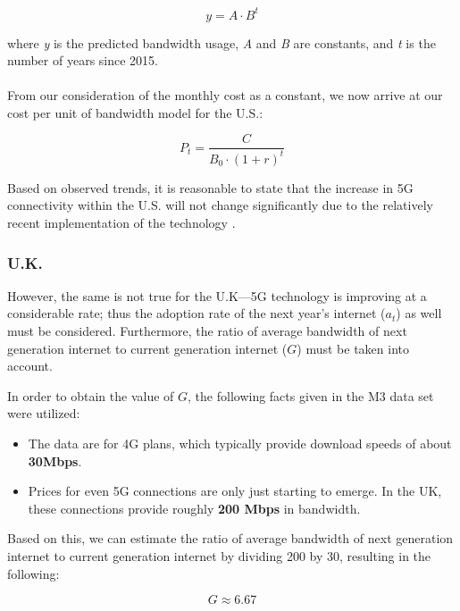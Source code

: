 \documentclass[12pt]{article}
\begin{document}
\begin{equation*}
    y = A \cdot B^{t}
\end{equation*}

where \emph{y} is the predicted bandwidth usage, \emph{A} and \emph{B} are constants, and \emph{t} is the number of years since 2015.
\\
\\
From our consideration of the monthly cost as a constant, we now arrive at our cost per unit of bandwidth model for the U.S.:

\begin{equation*}
    P_t = \frac{C}{B_0 \cdot (1+r)^t}
\end{equation*}

Based on observed trends, it is reasonable to state that the increase in 5G connectivity within the U.S. will not change significantly due to the relatively recent implementation of the technology \cite{sixg}.

\subsubsection{U.K.}

However, the same is not true for the U.K—5G technology is improving at a considerable rate; thus the adoption rate of the next year's internet ($a_t$) as well must be considered. Furthermore, the ratio of average bandwidth of next generation internet to current generation internet ($G$) must be taken into account.

In order to obtain the value of $G$, the following facts given in the M3 data set were utilized:

\begin{itemize}
    \item The data are for 4G plans, which typically provide download speeds of about \textbf{30Mbps}.	
\end{itemize}

\begin{itemize}
    \item Prices for even 5G connections are only just starting to emerge. In the UK, these connections provide roughly \textbf{200 Mbps} in bandwidth.				
\end{itemize}

Based on this, we can estimate the ratio of average bandwidth of next generation internet to current generation internet by dividing 200 by 30, resulting in the following:

\begin{equation*}
G \approx 6.67
\end{equation*}
\end{document}
